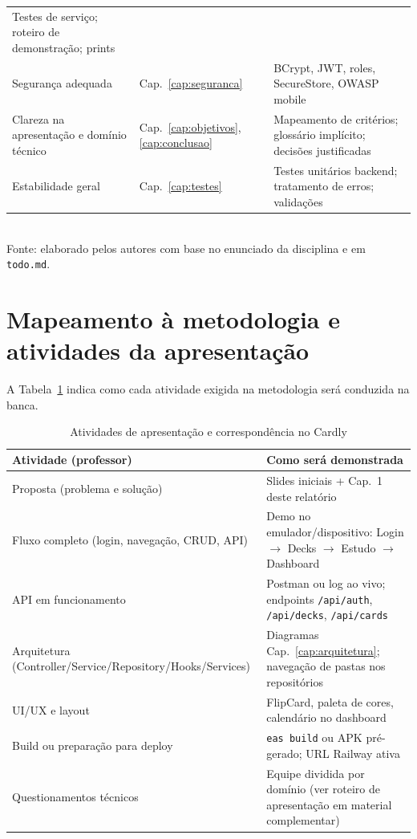 \begin{table}[htbp]
\begin{tabular}{p{4.2cm} p{3.8cm} p{6.5cm}}
        Testes de serviço; roteiro de demonstração; prints \\
        \addlinespace
        Segurança adequada &
        Cap.~\ref{cap:seguranca} &
        BCrypt, JWT, roles, SecureStore, OWASP mobile \\
        \addlinespace
        Clareza na apresentação e domínio técnico &
        Cap.~\ref{cap:objetivos}, \ref{cap:conclusao} &
        Mapeamento de critérios; glossário implícito; decisões justificadas \\
        \addlinespace
        Estabilidade geral &
        Cap.~\ref{cap:testes} &
        Testes unitários backend; tratamento de erros; validações \\
        \bottomrule
    \end{tabular}
    \\[0.5em]
    \footnotesize Fonte: elaborado pelos autores com base no enunciado da disciplina e em \texttt{todo.md}.
\end{table}

\section{Mapeamento à metodologia e atividades da apresentação}

A Tabela~\ref{tab:atividades-apresentacao} indica como cada atividade exigida na metodologia será conduzida na banca.

\begin{table}[htbp]
    \caption{Atividades de apresentação e correspondência no Cardly}
    \label{tab:atividades-apresentacao}
    \centering
    \small
    \begin{tabular}{p{5.5cm} p{8.5cm}}
        \toprule
        \textbf{Atividade (professor)} & \textbf{Como será demonstrada} \\
        \midrule
        Proposta (problema e solução) & Slides iniciais + Cap.~1 deste relatório \\
        Fluxo completo (login, navegação, CRUD, API) & Demo no emulador/dispositivo: Login $\rightarrow$ Decks $\rightarrow$ Estudo $\rightarrow$ Dashboard \\
        API em funcionamento & Postman ou log ao vivo; endpoints \texttt{/api/auth}, \texttt{/api/decks}, \texttt{/api/cards} \\
        Arquitetura (Controller/Service/Repository/Hooks/Services) & Diagramas Cap.~\ref{cap:arquitetura}; navegação de pastas nos repositórios \\
        UI/UX e layout & FlipCard, paleta de cores, calendário no dashboard \\
        Build ou preparação para deploy & \texttt{eas build} ou APK pré-gerado; URL Railway ativa \\
        Questionamentos técnicos & Equipe dividida por domínio (ver roteiro de apresentação em material complementar) \\
        \bottomrule
    \end{tabular}
\end{table}

